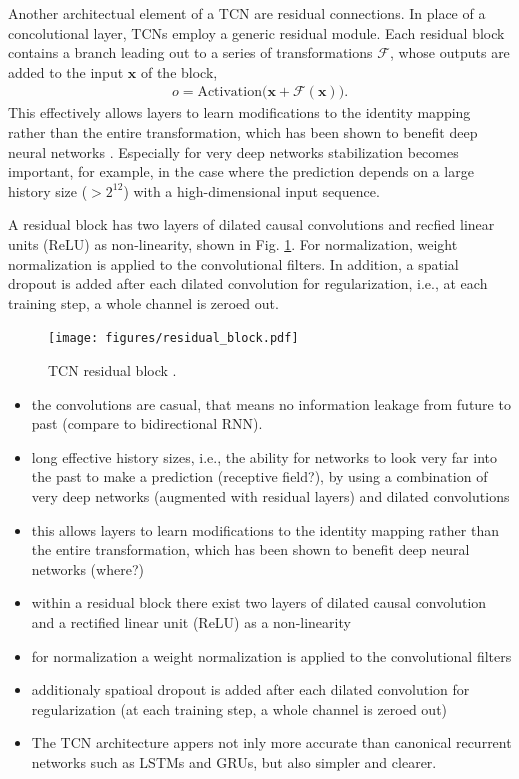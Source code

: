 \documentclass{scrartcl}
\begin{document}
Another architectual element of a TCN are residual connections. In place of a concolutional layer, TCNs employ a generic residual module. Each residual block contains a branch leading out to a series of transformations $\mathcal F$, whose outputs are added to the input $\mathbf x$ of the block, 
\begin{align}
o = \text{Activation} \big(\mathbf x + \mathcal F(\mathbf x)\big).
\end{align}
This effectively allows layers to learn modifications to the identity mapping rather than the entire transformation, which has been shown to benefit deep neural networks \cite{He2016}. Especially for very deep networks stabilization becomes important, for example, in the case where the prediction depends on a large history size ($> 2^{12}$) with a high-dimensional input sequence. 

A residual block has two layers of dilated causal convolutions and recfied linear units (ReLU) as non-linearity, shown in Fig. \ref{fig:residual_block}. For normalization, weight normalization \cite{Salimans2016} is applied to the convolutional filters. In addition, a spatial dropout \cite{Srivastava2014} is added after each dilated convolution for regularization, i.e., at each training step, a whole channel is zeroed out.
\begin{figure}[htbp]
    \centering
    \texttt{[image: figures/residual\_block.pdf]}
    \caption{TCN residual block \cite{Bai2018}.}
    \label{fig:residual_block} 
\end{figure}


\begin{itemize}
\item the convolutions are casual, that means no information leakage from future to past (compare to bidirectional RNN).
\item long effective history sizes, i.e., the ability for networks to look very far into the past to make a prediction (receptive field?), by using a combination of very deep networks (augmented with residual layers) and dilated convolutions 
\item this allows layers to learn modifications to the identity mapping rather than the entire transformation, which has been shown to benefit deep neural networks (where?)
\item within a residual block there exist two layers of dilated causal convolution and a rectified linear unit (ReLU) \cite[Nair2010]{Nair2010} as a non-linearity
\item for normalization a weight normalization \cite[Salimans2016]{Salimans2016} is applied to the convolutional filters 
\item additionaly spatioal dropout \cite[Srivastava2014]{Srivastava2014} is added after each dilated convolution for regularization (at each training step, a whole channel is zeroed out)
\item The TCN architecture appers not inly more accurate than canonical recurrent networks such as LSTMs and GRUs, but also simpler and clearer.
\end{itemize}
\end{document}
